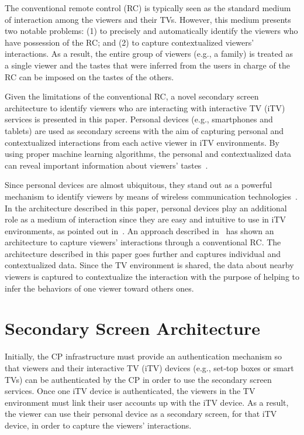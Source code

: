 \documentclass[conference,a4paper]{IEEEtran}
\begin{document}
The conventional remote control (RC) is typically seen as the standard medium of interaction among the viewers and their TVs. However, this medium presents two notable problems: (1) to precisely and automatically identify the viewers who have possession of the RC; and (2) to capture contextualized viewers' interactions. As a result, the entire group of viewers (e.g., a family) is treated as a single viewer and the tastes that were inferred from the users in charge of the RC can be imposed on the tastes of the others.

Given the limitations of the conventional RC, a novel secondary screen architecture to identify viewers who are interacting with interactive TV (iTV) services is presented in this paper. Personal devices (e.g., smartphones and tablets) are used as secondary screens with the aim of capturing personal and contextualized interactions from each active viewer in iTV environments. By using proper machine learning algorithms, the personal and contextualized data can reveal important information about viewers' tastes~\cite{Kim2012,Shin2009}. 

Since personal devices are almost ubiquitous, they stand out as a powerful mechanism to identify viewers by means of wireless communication technologies~\cite{Cabarcos2011}. In the architecture described in this paper, personal devices play an additional role as a medium of interaction since they are easy and intuitive to use in iTV environments, as pointed out in~\cite{Courtois2012}. An approach described in~\cite{Teixeira2010} has shown an architecture to capture viewers' interactions through a conventional RC. The architecture described in this paper goes further and captures individual and contextualized data. Since the TV environment is shared, the data about nearby viewers is captured to contextualize the interaction with the purpose of helping to infer the behaviors of one viewer toward others ones.

\section{Secondary Screen Architecture}

Initially, the CP infrastructure must provide an authentication mechanism so that viewers and their interactive TV (iTV) devices (e.g., set-top boxes or smart TVs) can be authenticated by the CP in order to use the secondary screen services. Once one iTV device is authenticated, the viewers in the TV environment must link their user accounts up with the iTV device. As a result, the viewer can use their personal device as a secondary screen, for that iTV device, in order to capture the viewers' interactions.
\end{document}
